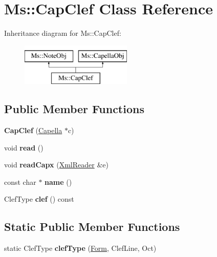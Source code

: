 \hypertarget{class_ms_1_1_cap_clef}{}\section{Ms\+:\+:Cap\+Clef Class Reference}
\label{class_ms_1_1_cap_clef}
Inheritance diagram for Ms\+:\+:Cap\+Clef\+:\begin{figure}[H]
\begin{center}
\leavevmode
\includegraphics[height=2.000000cm]{class_ms_1_1_cap_clef}
\end{center}
\end{figure}
\subsection*{Public Member Functions}
\begin{DoxyCompactItemize}
\item 
\mbox{\label{class_ms_1_1_cap_clef_a93b25f53fe4a4e358ab13c8ff1c57830}} 
{\bfseries Cap\+Clef} (\hyperlink{class_ms_1_1_capella}{Capella} $\ast$c)
\item 
\mbox{\label{class_ms_1_1_cap_clef_ab1b4f6c25bd883f1a4f9b137bb93f963}} 
void {\bfseries read} ()
\item 
\mbox{\label{class_ms_1_1_cap_clef_ae1cca35a4031e0ccc75734f5aba0cb57}} 
void {\bfseries read\+Capx} (\hyperlink{class_ms_1_1_xml_reader}{Xml\+Reader} \&e)
\item 
\mbox{\label{class_ms_1_1_cap_clef_a401e1afc0798d2c13eb5b386c0cb0f5a}} 
const char $\ast$ {\bfseries name} ()
\item 
\mbox{\label{class_ms_1_1_cap_clef_a3d639d9537a970237f3157c8ca83167a}} 
Clef\+Type {\bfseries clef} () const
\end{DoxyCompactItemize}
\subsection*{Static Public Member Functions}
\begin{DoxyCompactItemize}
\item 
\mbox{\label{class_ms_1_1_cap_clef_a5564ae3efedd42c5cf1f76e87354a9ef}} 
static Clef\+Type {\bfseries clef\+Type} (\hyperlink{class_form}{Form}, Clef\+Line, Oct)
\end{DoxyCompactItemize}
